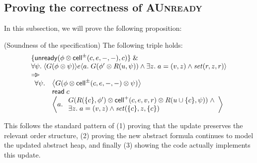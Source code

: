 \subsection{Proving the correctness of \textsc{AUnready}}

In this subsection, we will prove the following proposition:

\begin{prop*}{(Soundness of the  specification)}
The following triple holds:
\begin{displaymath}
\begin{array}{l}
\{{\mathsf{unready}({\phi \otimes \mathsf{cell}^{\pm}({c}, {e}, {-}, {-})}, {c})}\} \;\&\; \\
\forall \psi.\; \langle{G(\phi \otimes \psi)}\rangle{e}\langle{a}.\;{G(\phi' \otimes R(u, \psi)) \land \exists z.\; a = (v, z) \land \mathit{set}(r, z, r)}\rangle \\
\Rightarrow\!\!\!> \\
\begin{array}{ll}
 \forall \psi. & \left<G(\phi \otimes \mathsf{cell}^{\pm}({c}, {e}, {-}, {-}) \otimes \psi)\right> \\
               & \mathsf{read}\; c \\
               & \left<a.\; 
                   \begin{array}{l}
                     G(R(\{{c}\}, \phi') \otimes \mathsf{cell}^{+}({c}, {e}, {v}, {r}) \otimes R(u \cup \{{c}\}, \psi)) 
                      \;\land \\
                      \exists z.\;a = (v, z) \land \mathit{set}(\{{c}\}, z, \{{c}\})
                   \end{array}\right> 
\end{array}
\end{array}
\end{displaymath}
\end{prop*}

This follows the standard pattern of (1) proving that the update
preserves the relevant order structure, (2) proving the new abstract
formula continues to model the updated abstract heap, and finally (3)
showing the code actually implements this update. 


